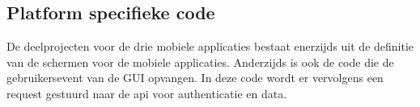 \subsection{Platform specifieke code}
De deelprojecten voor de drie mobiele applicaties bestaat enerzijds uit de definitie van de schermen voor de mobiele applicaties.
Anderzijds is ook de code die de gebruikersevent van de GUI opvangen. In deze code wordt er vervolgens een request gestuurd naar
de api voor authenticatie en data.
